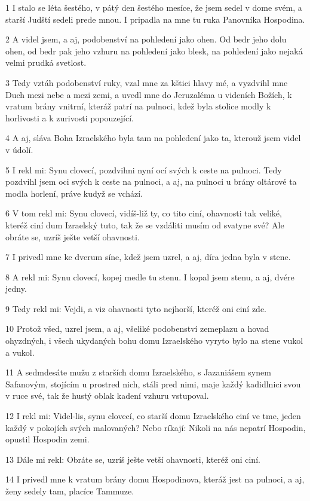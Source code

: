 \par 1 I stalo se léta šestého, v pátý den šestého mesíce, že jsem sedel v dome svém, a starší Judští sedeli prede mnou. I pripadla na mne tu ruka Panovníka Hospodina.
\par 2 A videl jsem, a aj, podobenství na pohledení jako ohen. Od bedr jeho dolu ohen, od bedr pak jeho vzhuru na pohledení jako blesk, na pohledení jako nejaká velmi prudká svetlost.
\par 3 Tedy vztáh podobenství ruky, vzal mne za kštici hlavy mé, a vyzdvihl mne Duch mezi nebe a mezi zemi, a uvedl mne do Jeruzaléma u videních Božích, k vratum brány vnitrní, kteráž patrí na pulnoci, kdež byla stolice modly k horlivosti a k zurivosti popouzející.
\par 4 A aj, sláva Boha Izraelského byla tam na pohledení jako ta, kterouž jsem videl v údolí.
\par 5 I rekl mi: Synu clovecí, pozdvihni nyní ocí svých k ceste na pulnoci. Tedy pozdvihl jsem oci svých k ceste na pulnoci, a aj, na pulnoci u brány oltárové ta modla horlení, práve kudyž se vchází.
\par 6 V tom rekl mi: Synu clovecí, vidíš-liž ty, co tito ciní, ohavnosti tak veliké, kteréž ciní dum Izraelský tuto, tak že se vzdáliti musím od svatyne své? Ale obráte se, uzríš ješte vetší ohavnosti.
\par 7 I privedl mne ke dverum síne, kdež jsem uzrel, a aj, díra jedna byla v stene.
\par 8 A rekl mi: Synu clovecí, kopej medle tu stenu. I kopal jsem stenu, a aj, dvére jedny.
\par 9 Tedy rekl mi: Vejdi, a viz ohavnosti tyto nejhorší, kteréž oni ciní zde.
\par 10 Protož všed, uzrel jsem, a aj, všeliké podobenství zemeplazu a hovad ohyzdných, i všech ukydaných bohu domu Izraelského vyryto bylo na stene vukol a vukol.
\par 11 A sedmdesáte mužu z starších domu Izraelského, s Jazaniášem synem Safanovým, stojícím u prostred nich, stáli pred nimi, maje každý kadidlnici svou v ruce své, tak že hustý oblak kadení vzhuru vstupoval.
\par 12 I rekl mi: Videl-lis, synu clovecí, co starší domu Izraelského ciní ve tme, jeden každý v pokojích svých malovaných? Nebo ríkají: Nikoli na nás nepatrí Hospodin, opustil Hospodin zemi.
\par 13 Dále mi rekl: Obráte se, uzríš ješte vetší ohavnosti, kteréž oni ciní.
\par 14 I privedl mne k vratum brány domu Hospodinova, kteráž jest na pulnoci, a aj, ženy sedely tam, placíce Tammuze.
